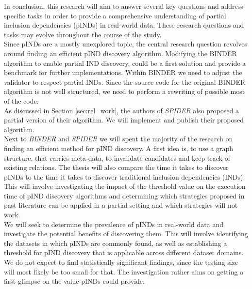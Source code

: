 In conclusion, this research will aim to answer several key questions and address specific tasks in order to provide a comprehensive understanding of partial inclusion dependencies (pINDs) in real-world data. These research questions and tasks may evolve throughout the course of the study. \\

\noindent Since pINDs are a mostly unexplored topic, the central research question revolves around finding an efficient pIND discovery algorithm. Modifying the BINDER algorithm to enable partial IND discovery, could be a first solution and provide a benchmark for further implementations. Within BINDER we need to adjust the validator to respect partial INDs. Since the source code for the original BINDER algorithm is not well structured, we need to perform a rewriting of possible most of the code. \\

\noindent As discussed in Section \ref{sec:rel_work}, the authors of \textit{SPIDER} also proposed a partial version of their algorithm. We will implement and publish their proposed algorithm. \\

\noindent Next to \textit{BINDER} and \textit{SPIDER} we will spent the majority of the research on finding an efficient method for pIND discovery. A first idea is, to use a graph structure, that carries meta-data, to invalidate candidates and keep track of existing relations. The thesis will also compare the time it takes to discover pINDs to the time it takes to discover traditional inclusion dependencies (INDs). This will involve investigating the impact of the threshold value on the execution time of pIND discovery algorithms and determining which strategies proposed in past literature can be applied in a partial setting and which strategies will not work. \\

\noindent We will seek to determine the prevalence of pINDs in real-world data and investigate the potential benefits of discovering them. This will involve identifying the datasets in which pINDs are commonly found, as well as establishing a threshold for pIND discovery that is applicable across different dataset domains. We do not expect to find statistically significant findings, since the testing size will most likely be too small for that. The investigation rather aims on getting a first glimpse on the value pINDs could provide.

